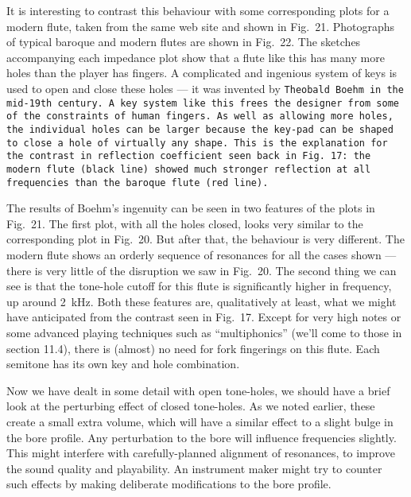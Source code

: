  It is interesting to contrast this behaviour with some corresponding plots 
  for a modern flute, taken from the same web site and shown in Fig.\ 21. 
  Photographs of typical baroque and modern flutes are shown in Fig.\ 22. The 
  sketches accompanying each impedance plot show that a flute like this has 
  many more holes than the player has fingers. A complicated and ingenious 
  system of keys is used to open and close these holes — it was invented by 
  \tt{}Theobald Boehm\rm{} in the mid-19th century. A key system like this 
  frees the designer from some of the constraints of human fingers. As well as 
  allowing more holes, the individual holes can be larger because the key-pad 
  can be shaped to close a hole of virtually any shape. This is the explanation 
  for the contrast in reflection coefficient seen back in Fig.\ 17: the modern 
  flute (black line) showed much stronger reflection at all frequencies than 
  the baroque flute (red line). 

  The results of Boehm’s ingenuity can be seen in two features of the plots in 
  Fig.\ 21. The first plot, with all the holes closed, looks very similar to 
  the corresponding plot in Fig.\ 20. But after that, the behaviour is very 
  different. The modern flute shows an orderly sequence of resonances for all 
  the cases shown — there is very little of the disruption we saw in Fig.\ 20. 
  The second thing we can see is that the tone-hole cutoff for this flute is 
  significantly higher in frequency, up around 2~kHz. Both these features are, 
  qualitatively at least, what we might have anticipated from the contrast seen 
  in Fig.\ 17. Except for very high notes or some advanced playing techniques 
  such as “multiphonics” (we’ll come to those in section 11.4), there is 
  (almost) no need for fork fingerings on this flute. Each semitone has its own 
  key and hole combination. 


  Now we have dealt in some detail with open tone-holes, we should have a brief 
  look at the perturbing effect of closed tone-holes. As we noted earlier, 
  these create a small extra volume, which will have a similar effect to a 
  slight bulge in the bore profile. Any perturbation to the bore will influence 
  frequencies slightly. This might interfere with carefully-planned alignment 
  of resonances, to improve the sound quality and playability. An instrument 
  maker might try to counter such effects by making deliberate modifications to 
  the bore profile. 


